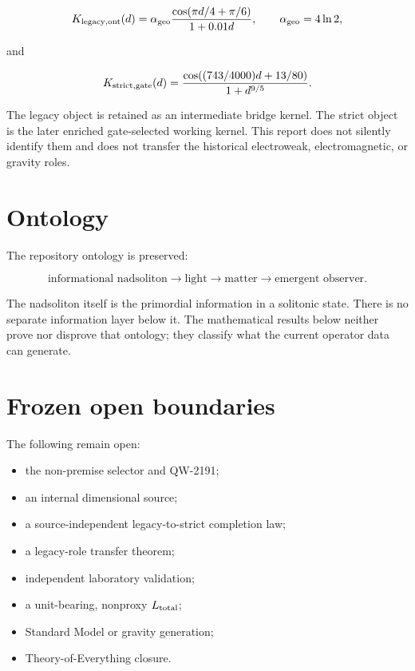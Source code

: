 \documentclass[11pt,a4paper,openany]{report}
\begin{document}
\[
K_{\rm legacy,ont}(d)=
\alpha_{\rm geo}
\frac{\cos(\pi d/4+\pi/6)}{1+0.01d},
\qquad
\alpha_{\rm geo}=4\ln2,
\]

and

\[
K_{\rm strict,gate}(d)=
\frac{\cos((743/4000)d+13/80)}{1+d^{9/5}}.
\]

The legacy object is retained as an intermediate bridge kernel. The strict object is the later enriched gate-selected working kernel. This report does not silently identify them and does not transfer the historical electroweak, electromagnetic, or gravity roles.

\section{Ontology}

The repository ontology is preserved:

\[
\text{informational nadsoliton}
\longrightarrow \text{light}
\longrightarrow \text{matter}
\longrightarrow \text{emergent observer}.
\]

The nadsoliton itself is the primordial information in a solitonic state. There is no separate information layer below it. The mathematical results below neither prove nor disprove that ontology; they classify what the current operator data can generate.

\section{Frozen open boundaries}

The following remain open:

\begin{itemize}
\item 
the non-premise selector and QW-2191;

\item 
an internal dimensional source;

\item 
a source-independent legacy-to-strict completion law;

\item 
a legacy-role transfer theorem;

\item 
independent laboratory validation;

\item 
a unit-bearing, nonproxy \(L_{\rm total}\);

\item 
Standard Model or gravity generation;

\item 
Theory-of-Everything closure.

\end{itemize}
\end{document}
